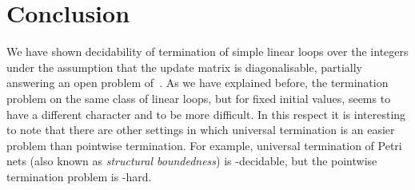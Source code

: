 \section{Conclusion}





We have shown decidability of termination of simple linear loops over
the integers under the assumption that the update matrix is
diagonalisable, partially answering an open problem
of~\cite{Tiw04,Bra06}.  As we have explained before, the termination
problem on the same class of linear loops, but for fixed initial
values, seems to have a different character and to be more difficult.
In this respect it is interesting to note that there are other
settings in which universal termination is an easier problem than
pointwise termination. For example, universal termination of Petri
nets (also known as \textit{structural boundedness}) is
\PTIME-decidable, but the pointwise termination problem is
\EXPSPACE-hard.

